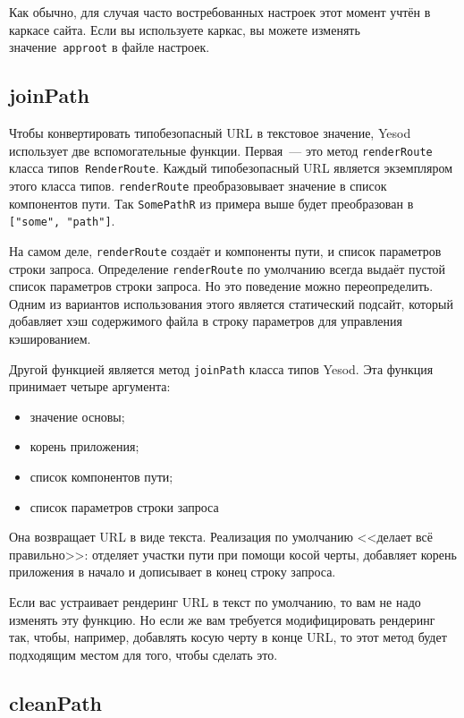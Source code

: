 Как обычно, для случая часто востребованных настроек этот момент учтён в
каркасе сайта. Если вы используете каркас, вы можете изменять
значение~\lstinline!approot! в файле настроек.

\subsection {joinPath}

Чтобы конвертировать типобезопасный URL в текстовое значение, Yesod использует
две вспомогательные функции. Первая~--- это метод \lstinline!renderRoute!
класса типов~\lstinline!RenderRoute!. Каждый типобезопасный URL является
экземпляром этого класса типов. \lstinline!renderRoute! преобразовывает
значение в список компонентов пути. Так \lstinline!SomePathR! из примера выше
будет преобразован в \lstinline!["some", "path"]!.

\begin{remark}
    На самом деле, \lstinline!renderRoute! создаёт и компоненты пути, и список
    параметров строки запроса. Определение \lstinline!renderRoute! по умолчанию
    всегда выдаёт пустой список параметров строки запроса. Но это поведение
    можно переопределить. Одним из вариантов использования этого является
    статический подсайт, который добавляет хэш содержимого файла в строку
    параметров для управления кэшированием.
\end{remark}

Другой функцией является метод \lstinline!joinPath! класса типов Yesod. Эта
функция принимает четыре аргумента:
\begin{itemize}
    \item значение основы;
    \item корень приложения;
    \item список компонентов пути;
    \item список параметров строки запроса
\end{itemize}
Она возвращает URL в виде текста. Реализация по умолчанию <<делает всё
правильно>>: отделяет участки пути при помощи косой черты, добавляет корень
приложения в начало и дописывает в конец строку запроса.

Если вас устраивает рендеринг URL в текст по умолчанию, то вам не надо изменять
эту функцию. Но если же вам требуется модифицировать рендеринг так, чтобы,
например, добавлять косую черту в конце URL, то этот метод будет подходящим
местом для того, чтобы сделать это.

\subsection{cleanPath}

